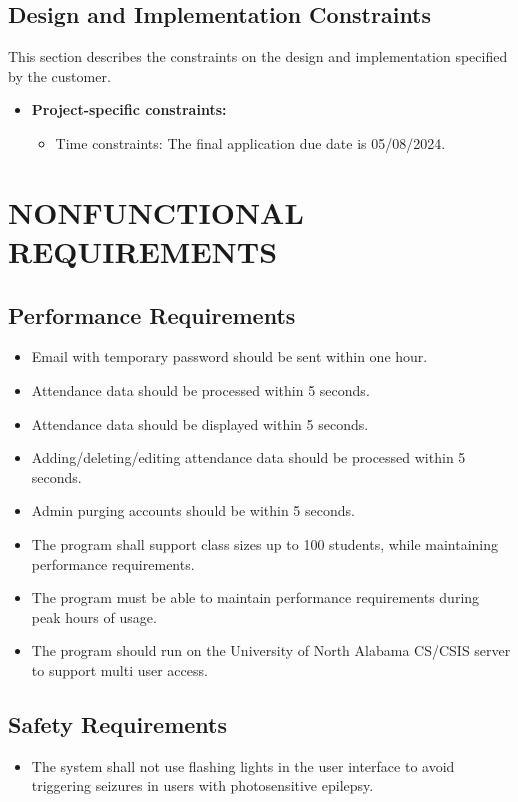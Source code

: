 \documentclass[letterpaper,12pt,oneside,listof=totoc]{scrreprt}
\begin{document}
\section{Design and Implementation Constraints}
This section describes the constraints on the design and implementation specified by the customer.
\begin{itemize}
\item \textbf{Project-specific constraints:}
	\begin{itemize}
	\item Time constraints: The final application due date is 05/08/2024.
	\end{itemize}
\end{itemize}

\chapter{NONFUNCTIONAL REQUIREMENTS}

\section{Performance Requirements}
\begin{itemize}
\item Email with temporary password should be sent within one hour.
\item Attendance data should be processed within 5 seconds.
\item Attendance data should be displayed within 5 seconds.
\item Adding/deleting/editing attendance data should be processed within 5 seconds.
\item Admin purging accounts should be within 5 seconds.
\item The program shall support class sizes up to 100 students, while maintaining performance requirements.
\item The program must be able to maintain performance requirements during peak hours of usage.
\item The program should run on the University of North Alabama CS/CSIS server to support multi user access.
\end{itemize}

\section{Safety Requirements}
\begin{itemize}
\item The system shall not use flashing lights in the user interface to avoid triggering seizures in users with photosensitive epilepsy.
\end{itemize}
\end{document}
